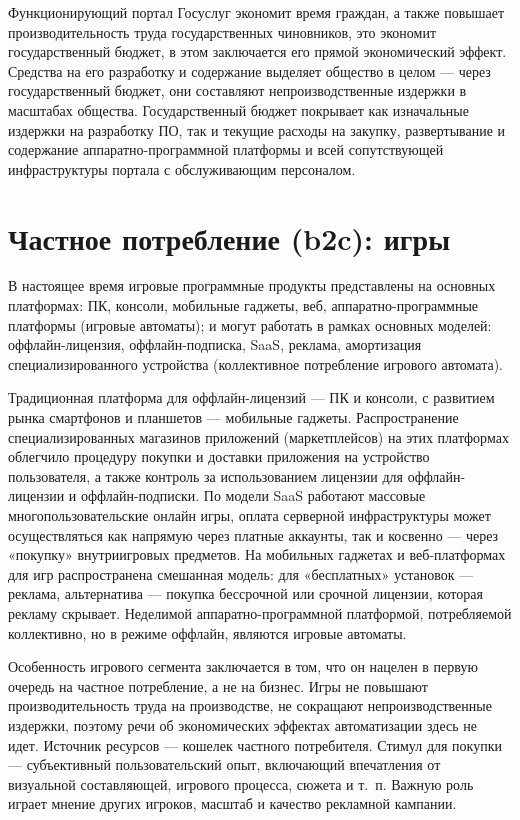\documentclass{article}
\begin{document}
Функционирующий портал Госуслуг экономит время граждан, а также повышает производительность труда государственных чиновников, это экономит государственный бюджет, в этом заключается его прямой экономический эффект. Средства на его разработку и содержание выделяет общество в целом — через государственный бюджет, они составляют непроизводственные издержки в масштабах общества. Государственный бюджет покрывает как изначальные издержки на разработку ПО, так и текущие расходы на закупку, развертывание и содержание аппаратно-программной платформы и всей сопутствующей инфраструктуры портала с обслуживающим персоналом.

\section*{Частное потребление (b2c): игры}

В настоящее время игровые программные продукты представлены на основных платформах: ПК, консоли, мобильные гаджеты, веб, аппаратно-программные платформы (игровые автоматы); и могут работать в рамках основных моделей: оффлайн-лицензия, оффлайн-подписка, SaaS, реклама, амортизация специализированного устройства (коллективное потребление игрового автомата).

Традиционная платформа для оффлайн-лицензий — ПК и консоли, с развитием рынка смартфонов и планшетов — мобильные гаджеты. Распространение специализированных магазинов приложений (маркетплейсов) на этих платформах облегчило процедуру покупки и доставки приложения на устройство пользователя, а также контроль за использованием лицензии для оффлайн-лицензии и оффлайн-подписки. По модели SaaS работают массовые многопользовательские онлайн игры, оплата серверной инфраструктуры может осуществляться как напрямую через платные аккаунты, так и косвенно — через «покупку» внутриигровых предметов. На мобильных гаджетах и веб-платформах для игр распространена смешанная модель: для «бесплатных» установок — реклама, альтернатива — покупка бессрочной или срочной лицензии, которая рекламу скрывает. Неделимой аппаратно-программной платформой, потребляемой коллективно, но в режиме оффлайн, являются игровые автоматы.

Особенность игрового сегмента заключается в том, что он нацелен в первую очередь на частное потребление, а не на бизнес. Игры не повышают производительность труда на производстве, не сокращают непроизводственные издержки, поэтому речи об экономических эффектах автоматизации здесь не идет. Источник ресурсов — кошелек частного потребителя. Стимул для покупки — субъективный пользовательский опыт, включающий впечатления от визуальной составляющей, игрового процесса, сюжета и т.~п. Важную роль играет мнение других игроков, масштаб и качество рекламной кампании.
\end{document}
